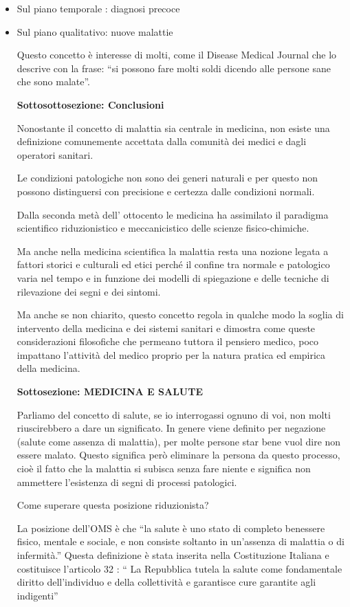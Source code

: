 \documentclass[]{article}
\begin{document}
\begin{itemize}
\item
  Sul piano temporale : diagnosi precoce
\item
  Sul piano qualitativo: nuove malattie

  Questo concetto è interesse di molti, come il Disease Medical Journal
  che lo descrive con la frase: ``si possono fare molti soldi dicendo
  alle persone sane che sono malate''.

  \textbf{Sottosottosezione: Conclusioni}

  Nonostante il concetto di malattia sia centrale in medicina, non
  esiste una definizione comunemente accettata dalla comunità dei medici
  e dagli operatori sanitari.

  Le condizioni patologiche non sono dei generi naturali e per questo
  non possono distinguersi con precisione e certezza dalle condizioni
  normali.

  Dalla seconda metà dell' ottocento le medicina ha assimilato il
  paradigma scientifico riduzionistico e meccanicistico delle scienze
  fisico-chimiche.

  Ma anche nella medicina scientifica la malattia resta una nozione
  legata a fattori storici e culturali ed etici perché il confine tra
  normale e patologico varia nel tempo e in funzione dei modelli di
  spiegazione e delle tecniche di rilevazione dei segni e dei sintomi.

  Ma anche se non chiarito, questo concetto regola in qualche modo la
  soglia di intervento della medicina e dei sistemi sanitari e dimostra
  come queste considerazioni filosofiche che permeano tuttora il
  pensiero medico, poco impattano l'attività del medico proprio per la
  natura pratica ed empirica della medicina.

  \textbf{Sottosezione: MEDICINA E SALUTE}

  Parliamo del concetto di salute, se io interrogassi ognuno di voi, non
  molti riuscirebbero a dare un significato. In genere viene definito
  per negazione (salute come assenza di malattia), per molte persone
  star bene vuol dire non essere malato. Questo significa però eliminare
  la persona da questo processo, cioè il fatto che la malattia si
  subisca senza fare niente e significa non ammettere l'esistenza di
  segni di processi patologici.

  Come superare questa posizione riduzionista?

  La posizione dell'OMS è che ``la salute è uno stato di completo
  benessere fisico, mentale e sociale, e non consiste soltanto in
  un'assenza di malattia o di infermità.'' Questa definizione è stata
  inserita nella Costituzione Italiana e costituisce l'articolo 32 : ``
  La Repubblica tutela la salute come fondamentale diritto
  dell'individuo e della collettività e garantisce cure garantite agli
  indigenti''


\end{itemize}
\end{document}

